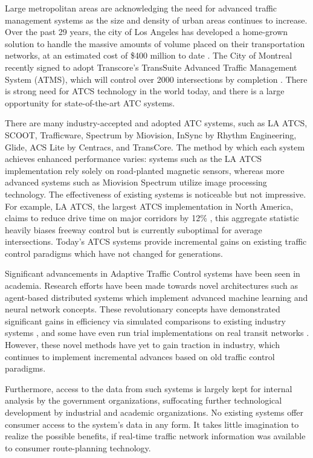 \documentclass{report}
\begin{document}
Large metropolitan areas are acknowledging the need for advanced traffic management systems as the size and density of urban areas continues to increase.
Over the past 29 years, the city of Los Angeles has developed a home-grown solution to handle the massive amounts of volume placed on their transportation networks, at an estimated cost of \$400 million to date \cite{la-atcs-article}.
The City of Montreal recently signed to adopt Transcore's TransSuite Advanced Traffic Management System (ATMS), which will control over 2000 intersections by completion \cite{montreal-transcore}.
There is strong need for ATCS technology in the world today, and there is a large opportunity for state-of-the-art ATC systems.

There are many industry-accepted and adopted ATC systems, such as LA ATCS, SCOOT, Trafficware, Spectrum by Miovision, InSync by Rhythm Engineering, Glide, ACS Lite by Centracs, and TransCore.
The method by which each system achieves enhanced performance varies: systems such as the LA ATCS implementation rely solely on road-planted magnetic sensors, whereas more advanced systems such as Miovision Spectrum utilize image processing technology.
The effectiveness of existing systems is noticeable but not impressive.
For example, LA ATCS, the largest ATCS implementation in North America, claims to reduce drive time on major corridors by 12\% \cite{la-atcs-article}, this aggregate statistic heavily biases freeway control but is currently suboptimal for average intersections.
Today's ATCS systems provide incremental gains on existing traffic control paradigms which have not changed for generations.

Significant advancements in Adaptive Traffic Control systems have been seen in academia.
Research efforts have been made towards novel architectures such as agent-based distributed systems which implement advanced machine learning and neural network concepts.
These revolutionary concepts have demonstrated significant gains in efficiency via simulated comparisons to existing industry systems \cite{1688100, 5073360, uot-article}, and some have even run trial implementations on real transit networks \cite{uot-article}.
However, these novel methods have yet to gain traction in industry, which continues to implement incremental advances based on old traffic control paradigms.

Furthermore, access to the data from such systems is largely kept for internal analysis by the government organizations, suffocating further technological development by industrial and academic organizations.
No existing systems offer consumer access to the system's data in any form.
It takes little imagination to realize the possible benefits, if real-time traffic network information was available to consumer route-planning technology.
\end{document}
